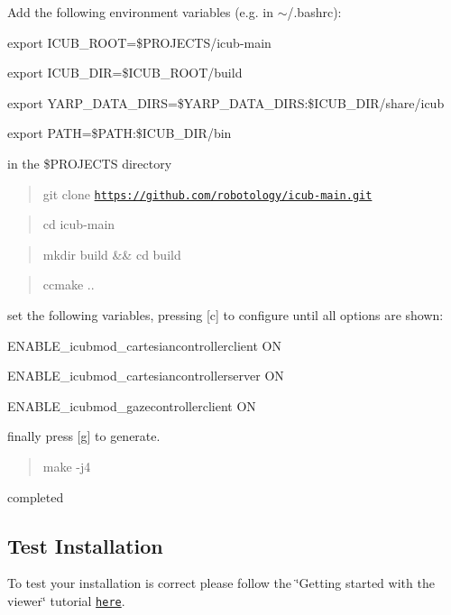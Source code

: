 Add the following environment variables (e.\+g. in $\sim$/.bashrc)\+:


\begin{DoxyItemize}
\item export I\+C\+U\+B\+\_\+\+R\+O\+OT=\$\+P\+R\+O\+J\+E\+C\+TS/icub-\/main
\item export I\+C\+U\+B\+\_\+\+D\+IR=\$\+I\+C\+U\+B\+\_\+\+R\+O\+OT/build
\item export Y\+A\+R\+P\+\_\+\+D\+A\+T\+A\+\_\+\+D\+I\+RS=\$\+Y\+A\+R\+P\+\_\+\+D\+A\+T\+A\+\_\+\+D\+I\+RS\+:\$\+I\+C\+U\+B\+\_\+\+D\+IR/share/icub
\item export P\+A\+TH=\$\+P\+A\+TH\+:\$\+I\+C\+U\+B\+\_\+\+D\+IR/bin
\end{DoxyItemize}

in the \$\+P\+R\+O\+J\+E\+C\+TS directory

\begin{quote}
git clone \href{https://github.com/robotology/icub-main.git}{\tt https\+://github.\+com/robotology/icub-\/main.\+git} \end{quote}


\begin{quote}
cd icub-\/main \end{quote}


\begin{quote}
mkdir build \&\& cd build \end{quote}


\begin{quote}
ccmake .. \end{quote}


set the following variables, pressing \mbox{[}c\mbox{]} to configure until all options are shown\+:


\begin{DoxyItemize}
\item E\+N\+A\+B\+L\+E\+\_\+icubmod\+\_\+cartesiancontrollerclient ON
\item E\+N\+A\+B\+L\+E\+\_\+icubmod\+\_\+cartesiancontrollerserver ON
\item E\+N\+A\+B\+L\+E\+\_\+icubmod\+\_\+gazecontrollerclient ON
\end{DoxyItemize}

finally press \mbox{[}g\mbox{]} to generate.

\begin{quote}
make -\/j4 \end{quote}


completed

\subsection*{Test Installation}

To test your installation is correct please follow the \char`\"{}\+Getting started with the viewer\char`\"{} tutorial \href{http://robotology.github.io/event-driven/doxygen/doc/html/pages.html}{\tt here}. 